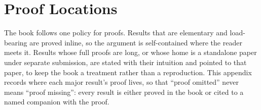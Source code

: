 
\chapter{Proof Locations}
\label{app:proofs}

The book follows one policy for proofs. Results that are elementary and
load-bearing are proved inline, so the argument is self-contained where the
reader meets it. Results whose full proofs are long, or whose home is a
standalone paper under separate submission, are stated with their intuition
and pointed to that paper, to keep the book a treatment rather than a
reproduction. This appendix records where each major result's proof lives, so
that ``proof omitted'' never means ``proof missing'': every result is either
proved in the book or cited to a named companion with the proof.

